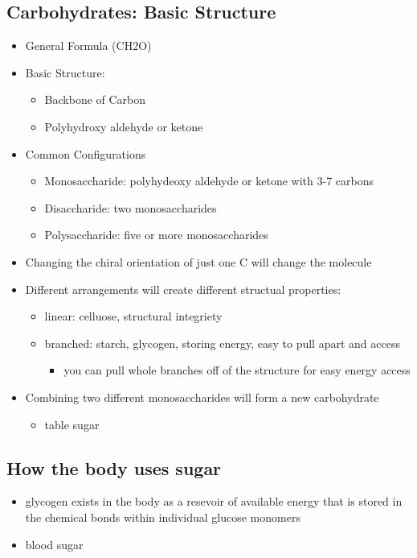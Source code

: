 \documentclass[11pt]{article}
\begin{document}
\subsection{Carbohydrates: Basic Structure}
\label{sec:orgbd03fb7}
\begin{itemize}
\item General Formula (CH2O)
\item Basic Structure:
\begin{itemize}
\item Backbone of Carbon
\item Polyhydroxy aldehyde or ketone
\end{itemize}
\item Common Configurations
\begin{itemize}
\item Monosaccharide: polyhydeoxy aldehyde or ketone with 3-7 carbons
\item Disaccharide: two monosaccharides
\item Polysaccharide: five or more monosaccharides
\end{itemize}
\item Changing the chiral orientation of just one C will change the molecule
\item Different arrangements will create different structual properties:
\begin{itemize}
\item linear: celluose, structural integriety
\item branched: starch, glycogen, storing energy, easy to pull apart and access
\begin{itemize}
\item you can pull whole branches off of the structure for easy energy access
\end{itemize}
\end{itemize}
\item Combining two different monosaccharides will form a new carbohydrate
\begin{itemize}
\item table sugar
\end{itemize}
\end{itemize}
\subsection{How the body uses sugar}
\label{sec:org2e58fb8}
\begin{itemize}
\item glycogen exists in the body as a resevoir of available energy that is stored in the chemical bonds within individual glucose monomers
\item blood sugar
\end{itemize}
\end{document}
